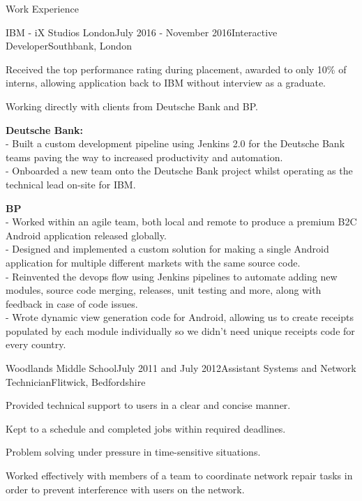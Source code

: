 \documentclass{resume} %
\begin{document}
\begin{rSection}{Work Experience}
	
\begin{rSubsection}{IBM - iX Studios London}{July 2016 - November 2016}{Interactive Developer}{Southbank, London}
	\item Received the top performance rating during placement, awarded to only 10\% of interns, allowing application back to IBM without interview as a graduate.
	\item Working directly with clients from Deutsche Bank and BP.
	\item \textbf{Deutsche Bank:}\\
	- Built a custom development pipeline using Jenkins 2.0 for the Deutsche Bank teams paving the way to increased productivity and automation.\\
	- Onboarded a new team onto the Deutsche Bank project whilst operating as the technical lead on-site for IBM.
	\item \textbf{BP}\\
	- Worked within an agile team, both local and remote to produce a premium B2C Android application released globally.\\
	- Designed and implemented a custom solution for making a single Android application for multiple different markets with the same source code.\\
	- Reinvented the devops flow using Jenkins pipelines to automate adding new modules, source code merging, releases, unit testing and more, along with feedback in case of code issues.\\
	- Wrote dynamic view generation code for Android, allowing us to create receipts populated by each module individually so we didn't need unique receipts code for every country.
\end{rSubsection}


\begin{rSubsection}{Woodlands Middle School}{July 2011 and July 2012}{Assistant Systems and Network Technician}{Flitwick, Bedfordshire}
	\item Provided technical support to users in a clear and concise manner.
	\item Kept to a schedule and completed jobs within required deadlines.
	\item Problem solving under pressure in time-sensitive situations.
	\item Worked effectively with members of a team to coordinate network repair tasks in order to prevent interference with users on the network.
\end{rSubsection}


\end{rSection}
\end{document}

